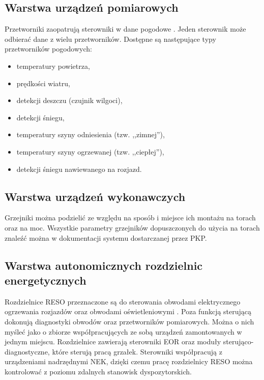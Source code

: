 \subsection{Warstwa urządzeń pomiarowych}
Przetworniki zaopatrują sterowniki w dane pogodowe \cite{dimacek-wytyczne}. Jeden sterownik może odbierać dane z wielu przetworników. Dostępne są następujące typy przetworników pogodowych:
\begin{itemize}
\item temperatury powietrza,
\item prędkości wiatru,
\item detekcji deszczu (czujnik wilgoci),
\item detekcji śniegu,
\item temperatury szyny odniesienia (tzw. ,,zimnej''),
\item temperatury szyny ogrzewanej (tzw. ,,ciepłej''),
\item detekcji śniegu nawiewanego na rozjazd.
\end{itemize}

\subsection{Warstwa urządzeń wykonawczych}
Grzejniki można podzielić ze względu na sposób i miejsce ich montażu na torach oraz na moc. Wszystkie parametry grzejników dopuszczonych do użycia na torach znaleźć można w dokumentacji systemu dostarczanej przez PKP.


\subsection{Warstwa autonomicznych rozdzielnic energetycznych}
Rozdzielnice RESO przeznaczone są do sterowania obwodami elektrycznego ogrzewania rozjazdów oraz obwodami oświetleniowymi \cite{dimacek-wytyczne}. Poza funkcją sterującą dokonują diagnostyki obwodów oraz przetworników pomiarowych. Można o nich myśleć jako o zbiorze współpracujących ze sobą urządzeń zamontowanych w jednym miejscu. Rozdzielnice zawierają sterowniki EOR oraz moduły sterująco-diagnostyczne, które sterują pracą grzałek. Sterowniki współpracują z urządzeniami nadrzędnymi NEK, dzięki czemu pracę rozdzielnicy RESO można kontrolować z poziomu zdalnych stanowisk dyspozytorskich.

